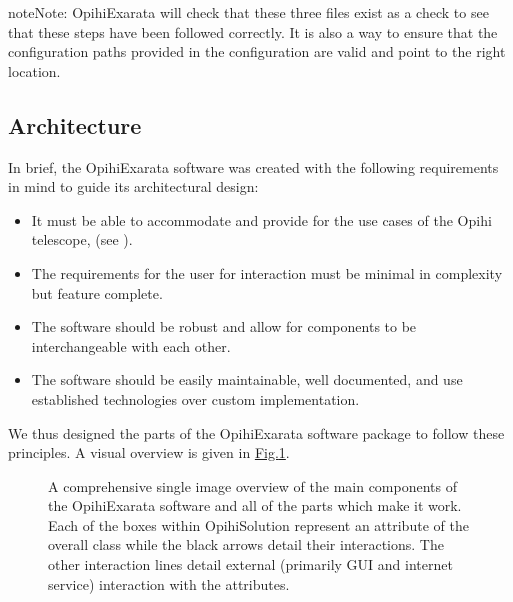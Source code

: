 \documentclass[letterpaper,11pt,english]{sphinxmanual}
\begin{document}
\begin{sphinxadmonition}{note}{Note:}
\sphinxAtStartPar
OpihiExarata will check that these three files exist as a check to see
that these steps have been followed correctly. It is also a way to ensure
that the configuration paths provided in the configuration are valid and
point to the right location.
\end{sphinxadmonition}

\sphinxstepscope


\subsection{Architecture}
\label{\detokenize{technical/architecture/index:architecture}}\label{\detokenize{technical/architecture/index:technical-architecture}}\label{\detokenize{technical/architecture/index::doc}}
\sphinxAtStartPar
In brief, the OpihiExarata software was created with the following requirements
in mind to guide its architectural design:
\begin{itemize}
\item {} 
\sphinxAtStartPar
It must be able to accommodate and provide for the use cases of the Opihi telescope, (see {\hyperref[\detokenize{user/index:user-index}]{}}).

\item {} 
\sphinxAtStartPar
The requirements for the user for interaction must be minimal in complexity but feature complete.

\item {} 
\sphinxAtStartPar
The software should be robust and allow for components to be interchangeable with each other.

\item {} 
\sphinxAtStartPar
The software should be easily maintainable, well documented, and use established technologies over custom implementation.

\end{itemize}

\sphinxAtStartPar
We thus designed the parts of the OpihiExarata software package to follow
these principles. A visual overview is given in
\hyperref[\detokenize{technical/architecture/index:figure-software-framework-diagram}]{Fig.\@ \ref{\detokenize{technical/architecture/index:figure-software-framework-diagram}}}.

\begin{figure}[H]
\centering
\capstart

\noindent{}
\caption{A comprehensive single image overview of the main components of the
OpihiExarata software and all of the parts which make it work. Each of the
boxes within OpihiSolution represent an attribute of the overall class
while the black arrows detail their interactions. The other interaction
lines detail external (primarily GUI and internet service) interaction
with the attributes.}\label{\detokenize{technical/architecture/index:id1}}\label{\detokenize{technical/architecture/index:figure-software-framework-diagram}}\end{figure}
\end{document}
